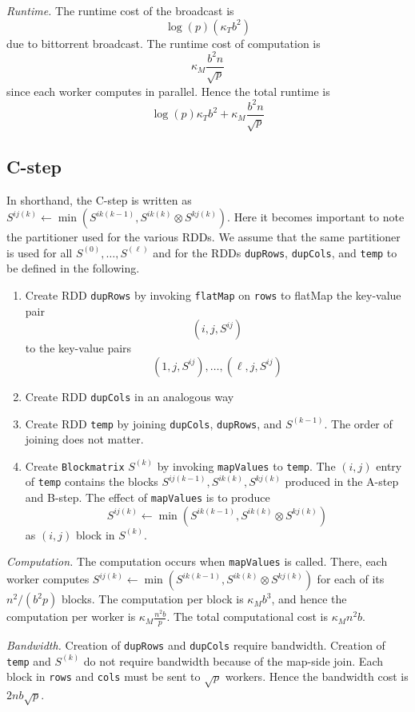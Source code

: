 \documentclass{article} %
\begin{document}
\emph{Runtime.} The runtime cost of the broadcast is
\[
\log(p)(\kappa_T b^2)
\]
due to bittorrent broadcast.
The runtime cost of computation is
\[
\kappa_M \frac{b^2 n}{\sqrt{p}}
\]
since each worker computes in parallel.
Hence the total runtime is
\[
\log(p)\kappa_T b^2 + \kappa_M \frac{b^2 n}{\sqrt{p}}
\]

\subsection{C-step}

In shorthand, the C-step is written as $S^{ij(k)} \leftarrow \min(S^{ik(k-1)}, S^{ik(k)} \otimes S^{kj(k)})$.
Here it becomes important to note the partitioner used for the various RDDs.
We assume that the same partitioner is used for all $S^{(0)}, \hdots, S^{(\ell)}$
and for the RDDs {\tt dupRows}, {\tt dupCols}, and {\tt temp} to be defined in the following.

\begin{enumerate}
\item Create RDD {\tt dupRows} by invoking {\tt flatMap} on {\tt rows} to flatMap the key-value pair
\[
(i, j, S^{ij})
\]
to the key-value pairs
\[
(1, j, S^{ij}), \hdots, (\ell, j, S^{ij})
\]
\item Create RDD {\tt dupCols} in an analogous way
\item Create RDD {\tt temp} by joining {\tt dupCols}, {\tt dupRows},
  and $S^{(k-1)}$.  The order of joining does not matter.
\item Create {\tt Blockmatrix} $S^{(k)}$ by invoking {\tt mapValues}
  to {\tt temp}.  The $(i, j)$ entry of {\tt temp} contains the blocks
  $S^{ij(k-1)}, S^{ik(k)}, S^{kj(k)}$ produced in the A-step and
  B-step.  The effect of {\tt mapValues} is to produce
\[
S^{ij(k)} \leftarrow \min(S^{ik(k-1)}, S^{ik(k)} \otimes S^{kj(k)})
\]
as $(i, j)$ block in $S^{(k)}$.
\end{enumerate}

\emph{Computation.}  The computation occurs when {\tt mapValues} is
called.  There, each worker computes $S^{ij(k)} \leftarrow
\min(S^{ik(k-1)}, S^{ik(k)} \otimes S^{kj(k)})$ for each of its
$n^2/(b^2 p)$ blocks.  The computation per block is $\kappa_M b^3$, and
hence the computation per worker is $\kappa_M \frac{n^2b}{p}$.
The total computational cost is $\kappa_M n^2b$.

\emph{Bandwidth.} Creation of {\tt dupRows} and {\tt dupCols} require
bandwidth.  Creation of {\tt temp} and $S^{(k)}$ do not require
bandwidth because of the map-side join.  Each block in {\tt rows} and
{\tt cols} must be sent to $\sqrt{p}$ workers.
Hence the bandwidth cost is $2 n b \sqrt{p}$.
\end{document}
